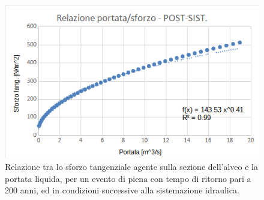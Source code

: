 \begin{figure}[H] \centering
    \includegraphics[scale=0.75]{immagini/rel_port_sforzo_post_sist.png}
    \caption{Relazione tra lo sforzo tangenziale agente sulla sezione dell'alveo e la portata liquida, per un evento di piena con tempo di ritorno pari a 200 anni, ed in condizioni successive alla sistemazione idraulica.}
    \label{rel_port_sforzo_post_sist}
\end{figure}


